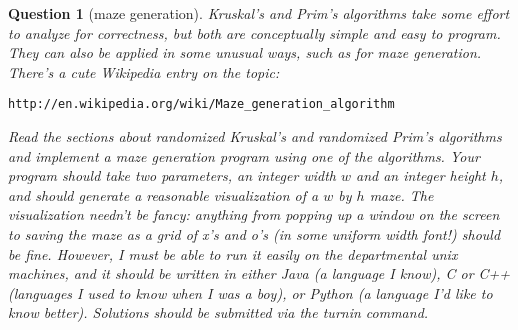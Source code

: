\documentclass[10pt]{article}
\newtheorem{question}{Question}
\begin{document}
\begin{question}[maze generation]
Kruskal's and Prim's algorithms take some effort to analyze for correctness, but both are conceptually simple and easy to program.
They can also be applied in some unusual ways, such as for maze generation.
There's a cute Wikipedia entry on the topic:
\begin{verbatim}
http://en.wikipedia.org/wiki/Maze_generation_algorithm
\end{verbatim}
Read the sections about randomized Kruskal's and randomized Prim's algorithms and implement a maze generation program using one of the algorithms.  Your program should take two parameters, an integer width $w$ and an integer height $h$, and should generate a reasonable
visualization of a $w$ by $h$ maze.  The visualization needn't be fancy: anything from popping up a window on the screen to saving the maze
as a grid of x's and o's (in some uniform width font!) should be fine.
However, I must be able to run it easily on the departmental  unix machines, and it should be written in either Java (a language I know), C or C++ (languages I used to know when I was a boy), or Python (a language I'd like to know better).
Solutions should be submitted via the {\em turnin} command.
\end{question}
\end{document}
